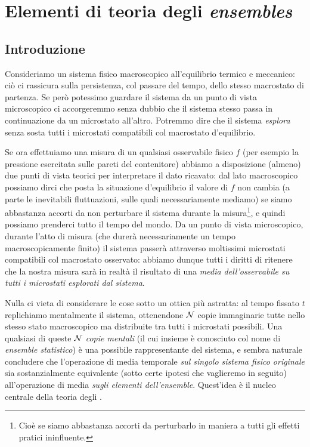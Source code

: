 \chapter{Elementi di teoria degli {\em ensembles}}
\label{cap:elementi}

\section{Introduzione}

Consideriamo un sistema fisico macroscopico all'equilibrio termico e meccanico: ciò ci rassicura sulla persistenza, col passare del tempo, dello stesso macrostato di partenza. Se però potessimo guardare il sistema da un punto di vista microscopico ci accorgeremmo senza dubbio che il sistema stesso passa in continuazione da un microstato all'altro. Potremmo dire che il sistema {\em esplora} senza sosta tutti i microstati compatibili col macrostato d'equilibrio.

Se ora effettuiamo una misura di un qualsiasi osservabile fisico $f$ (per esempio la pressione esercitata sulle pareti del contenitore) abbiamo a disposizione (almeno) due punti di vista teorici per interpretare il dato ricavato: dal lato macroscopico possiamo dirci che posta la situazione d'equilibrio il valore di $f$ non cambia (a parte le inevitabili fluttuazioni, sulle quali necessariamente mediamo) se siamo abbastanza accorti da non perturbare il sistema durante la misura\footnote{Cioè se siamo abbastanza accorti da perturbarlo in maniera a tutti gli effetti pratici ininfluente.}, e quindi possiamo prenderci tutto il tempo del mondo. Da un punto di vista microscopico, durante l'atto di misura (che durerà necessariamente un tempo macroscopicamente finito) il sistema passerà attraverso moltissimi microstati compatibili col macrostato osservato: abbiamo dunque tutti i diritti di ritenere che la nostra misura sarà in realtà il risultato di una {\em media dell'osservabile su tutti i microstati esplorati dal sistema}.

Nulla ci vieta di considerare le cose sotto un ottica più astratta: al tempo fissato $t$ replichiamo mentalmente il sistema, ottenendone ${\mathcal N}$ copie immaginarie tutte nello stesso stato macroscopico ma distribuite tra tutti i microstati possibili. Una qualsiasi di queste ${\mathcal N}$ {\em copie mentali} (il cui insieme è conosciuto col nome di {\em ensemble statistico}) è una possibile rappresentante del sistema, e sembra naturale concludere che l'operazione di media temporale {\em sul singolo sistema fisico originale} sia sostanzialmente equivalente (sotto certe ipotesi che vaglieremo in seguito) all'operazione di media {\em sugli elementi dell'ensemble}. Quest'idea è il nucleo centrale della teoria degli \ensembles.

